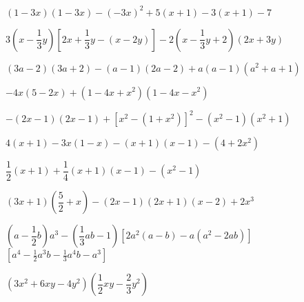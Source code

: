 \begin{esercizio}[\Ast]
\begin{enumeratea}
% 
 \item $(1-3x)(1-3x)-(-3x)^{2}+5(x+1)-3(x+1)-7$
 \item 
$3\left(x-\dfrac{1}{3}y\right)\left[2x+\dfrac{1}{3}y-(x-2y)\right]
-2\left(x-\dfrac{1}{3}y+2\right)(2x+3y)$
 \item $(3a-2)(3a+2)-(a-1)(2a-2)+a(a-1)\left(a^{2}+a+1\right)$
 \item $-4x(5-2x)+\left(1-4x+x^{2}\right)\left(1-4x-x^{2}\right)$
 \item 
$-(2x-1)(2x-1)+\left[x^{2}-\left(1+x^{2}\right)\right]^{2}-\left(x^{2}
-1\right)\left(x^{2}+1\right)$
% 
 \item $4(x+1)-3x(1-x)-(x+1)(x-1)-\left(4+2x^{2}\right)$
 \item $\dfrac{1}{2}(x+1)+\dfrac{1}{4}(x+1)(x-1)-\left(x^{2}-1\right)$
 \item $(3x+1)\left(\dfrac{5}{2}+x\right)-(2x-1)(2x+1)(x-2)+2x^{3}$
 \item $\left(a-\dfrac{1}{2}b\right)a^{3}-\left(\dfrac{1}{3}{ab}-1\right)
 \left[2a^{2}(a-b)-a\left(a^{2}-2{ab}\right)\right]$
  \hfill $\left[a^{4}-\frac{1}{2}a^{3}b-\frac{1}{3}a^{4}b-a^{3}\right]$
 \item $\left(3x^2+6xy-4y^2\right)\left(\dfrac{1}{2}xy-\dfrac{2}{3}y^2\right)$

\end{enumeratea}
\end{esercizio}

